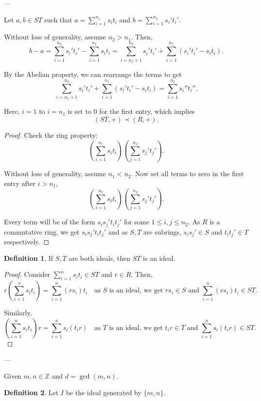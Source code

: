 \documentclass[11pt]{article}
\theoremstyle{definition}
\newtheorem{definition}{Definition}[section]
\theoremstyle{remark}
\begin{document}
---

Let $a, b \in ST$ such that $a = \sum_{i=1}^{n_1} s_i t_i$ and $b = \sum_{i=1}^{n_2} s_i' t_i'$.

Without loss of generality, assume $n_2 > n_1$. Then,
\[
b - a = \sum_{i=1}^{n_2} s_i' t_i' - \sum_{i=1}^{n_1} s_i t_i = \sum_{i=n_1+1}^{n_2} s_i' t_i' + \sum_{i=1}^{n_1} (s_i' t_i' - s_i t_i).
\]

By the Abelian property, we can rearrange the terms to get
\[
\sum_{i=n_1+1}^{n_2} s_i' t_i' + \sum_{i=1}^{n_1} (s_i' t_i' - s_i t_i) = \sum_{i=1}^{n_2} s_i'' t_i''.
\]

Here, $i = 1$ to $i = n_1$ is set to $0$ for the first entry, which implies
\[
(ST, +) \prec (R, +).
\]

\begin{proof}
Check the ring property:
\[
\left(\sum_{i=1}^{n_1} s_i t_i\right) \left(\sum_{j=1}^{n_2} s_j' t_j'\right).
\]

Without loss of generality, assume $n_1 < n_2$. Now set all terms to zero in the first entry after $i > n_1$,
\[
\left(\sum_{i=1}^{n_2} s_i t_i\right) \left(\sum_{j=1}^{n_2} s_j' t_j'\right).
\]

Every term will be of the form $s_i s_j' t_i t_j'$ for some $1 \leq i, j \leq n_2$. As $R$ is a commutative ring, we get $s_i s_j' t_i t_j'$ and as $S, T$ are subrings, $s_i s_j' \in S$ and $t_i t_j' \in T$ respectively.
\end{proof}

\begin{definition}\label{def:ideal_product}
If $S, T$ are both ideals, then $ST$ is an ideal.
\end{definition}

\begin{proof}
Consider $\sum_{i=1}^{n} s_i t_i \in ST$ and $r \in R$. Then,
\[
r \left(\sum_{i=1}^{n} s_i t_i\right) = \sum_{i=1}^{n} (r s_i) t_i \quad \text{as } S \text{ is an ideal, we get } r s_i \in S \text{ and } \sum_{i=1}^{n} (r s_i) t_i \in ST.
\]

Similarly,
\[
\left(\sum_{i=1}^{n} s_i t_i\right) r = \sum_{i=1}^{n} s_i (t_i r) \quad \text{as } T \text{ is an ideal, we get } t_i r \in T \text{ and } \sum_{i=1}^{n} s_i (t_i r) \in ST.
\]
\end{proof}

---

Given $m, n \in \mathbb{Z}$ and $d = \gcd(m, n)$.

\begin{definition}\label{def:ideal_generated}
Let $I$ be the ideal generated by $\{m, n\}$.
\end{definition}
\end{document}
